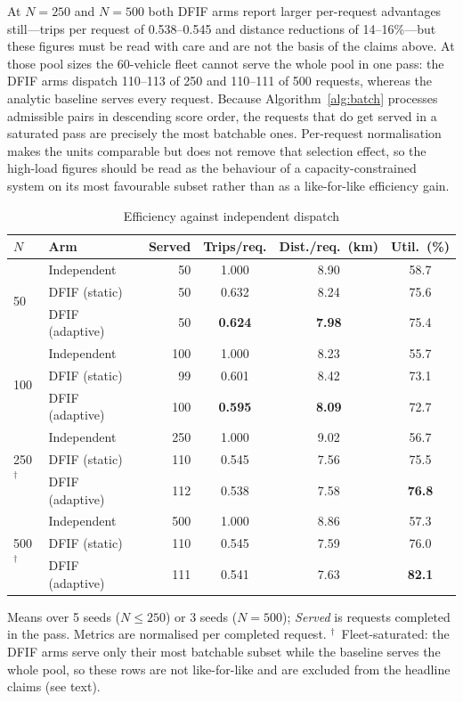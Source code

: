 \documentclass[conference]{IEEEtran}
\begin{document}
At $N=250$ and $N=500$ both DFIF arms report larger per-request advantages
still---trips per request of 0.538--0.545 and distance reductions of
14--16\%---but these figures must be read with care and are not the basis of
the claims above. At those pool sizes the 60-vehicle fleet cannot serve the
whole pool in one pass: the DFIF arms dispatch 110--113 of 250 and 110--111
of 500 requests, whereas the analytic baseline serves every request. Because
Algorithm~\ref{alg:batch} processes admissible pairs in descending score
order, the requests that do get served in a saturated pass are precisely the
most batchable ones. Per-request normalisation makes the units comparable
but does not remove that selection effect, so the high-load figures should be
read as the behaviour of a capacity-constrained system on its most favourable
subset rather than as a like-for-like efficiency gain.

\begin{table}[t]
\caption{Efficiency against independent dispatch}
\label{tab:main}
\centering
\footnotesize
\setlength{\tabcolsep}{4pt}
\begin{tabular}{@{}llrccc@{}}
\toprule
$N$ & Arm & Served & Trips/req. & Dist./req.\ (km) & Util.\ (\%) \\
\midrule
\multirow{3}{*}{50}
 & Independent      & 50  & 1.000 & 8.90 & 58.7 \\
 & DFIF (static)    & 50  & 0.632 & 8.24 & 75.6 \\
 & DFIF (adaptive)  & 50  & \textbf{0.624} & \textbf{7.98} & 75.4 \\
\midrule
\multirow{3}{*}{100}
 & Independent      & 100 & 1.000 & 8.23 & 55.7 \\
 & DFIF (static)    & 99  & 0.601 & 8.42 & 73.1 \\
 & DFIF (adaptive)  & 100 & \textbf{0.595} & \textbf{8.09} & 72.7 \\
\midrule
\multirow{3}{*}{250$^{\dagger}$}
 & Independent      & 250 & 1.000 & 9.02 & 56.7 \\
 & DFIF (static)    & 110 & 0.545 & 7.56 & 75.5 \\
 & DFIF (adaptive)  & 112 & 0.538 & 7.58 & \textbf{76.8} \\
\midrule
\multirow{3}{*}{500$^{\dagger}$}
 & Independent      & 500 & 1.000 & 8.86 & 57.3 \\
 & DFIF (static)    & 110 & 0.545 & 7.59 & 76.0 \\
 & DFIF (adaptive)  & 111 & 0.541 & 7.63 & \textbf{82.1} \\
\bottomrule
\end{tabular}
\vspace{2pt}
\begin{minipage}{\columnwidth}\raggedright\scriptsize
Means over 5 seeds ($N\le250$) or 3 seeds ($N=500$); \emph{Served} is
requests completed in the pass. Metrics are normalised per completed request.
$^{\dagger}$~Fleet-saturated: the DFIF arms serve only their most batchable
subset while the baseline serves the whole pool, so these rows are not
like-for-like and are excluded from the headline claims (see text).
\end{minipage}
\end{table}
\end{document}
